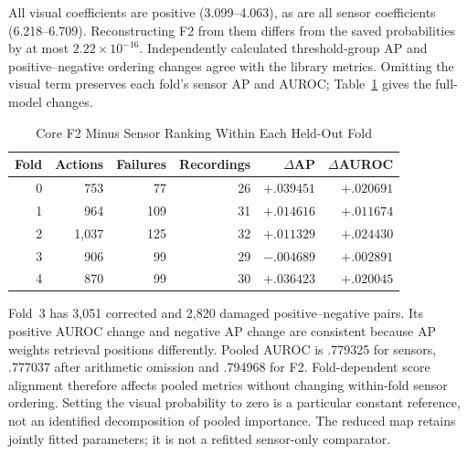 All visual coefficients are positive (3.099--4.063), as are all sensor coefficients (6.218--6.709). Reconstructing F2 from them differs from the saved probabilities by at most $2.22\times10^{-16}$. Independently calculated threshold-group AP and positive--negative ordering changes agree with the library metrics. Omitting the visual term preserves each fold's sensor AP and AUROC; Table~\ref{tab:f2-fold-audit} gives the full-model changes.

\begin{table}[htbp]
\caption{Core F2 Minus Sensor Ranking Within Each Held-Out Fold}\label{tab:f2-fold-audit}
\centering\small
\begin{tabular}{rrrrrr}\toprule
Fold & Actions & Failures & Recordings & $\Delta$AP & $\Delta$AUROC\\\midrule
0 & 753 & 77 & 26 & $+.039451$ & $+.020691$\\
1 & 964 & 109 & 31 & $+.014616$ & $+.011674$\\
2 & 1,037 & 125 & 32 & $+.011329$ & $+.024430$\\
3 & 906 & 99 & 29 & $-.004689$ & $+.002891$\\
4 & 870 & 99 & 30 & $+.036423$ & $+.020045$\\\bottomrule
\end{tabular}
\end{table}
Fold~3 has 3,051 corrected and 2,820 damaged positive--negative pairs. Its positive AUROC change and negative AP change are consistent because AP weights retrieval positions differently. Pooled AUROC is .779325 for sensors, .777037 after arithmetic omission and .794968 for F2. Fold-dependent score alignment therefore affects pooled metrics without changing within-fold sensor ordering. Setting the visual probability to zero is a particular constant reference, not an identified decomposition of pooled importance. The reduced map retains jointly fitted parameters; it is not a refitted sensor-only comparator.
